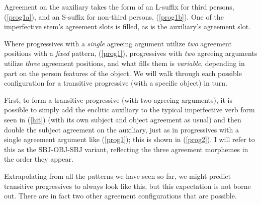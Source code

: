 \documentclass[output=paper
,modfonts
,nonflat]{langsci/langscibook}
\begin{document}
\eal \label{prog1}
\zl

\noindent Agreement on the auxiliary takes the form of an L-suffix for third persons, (\ref{prog1a}), and an S-suffix for non-third persons, (\ref{prog1b}). One of the imperfective stem's agreement slots is filled, as is the auxiliary's agreement slot.

Where progressives with a \textit{single} agreeing argument utilize \textit{two} agreement positions with a \textit{fixed} pattern, (\ref{prog1}), progressives with \textit{two} agreeing arguments utilize \emph{three} agreement positions, and what fills them is \emph{variable}, depending in part on the person features of the object. We will walk through each possible configuration for a transitive progressive (with a specific object) in turn. 

First, to form a transitive progressive (with two agreeing arguments), it is possible to simply add the enclitic auxiliary to the typical imperfective verb form seen in  (\ref{hit}) (with its own subject and object agreement as usual) and then double the subject agreement on the auxiliary, just as in progressives with a single agreement argument like (\ref{prog1}); this is shown in (\ref{prog2}). I will refer to this as the SBJ-OBJ-SBJ variant, reflecting the three agreement morphemes in the order they appear.

\eal \label{prog2}
\zl

\noindent Extrapolating from all the patterns we have seen so far, we might predict transitive progressives to always look like this, but this expectation is not borne out. There are in fact two other agreement configurations that are possible.
\end{document}

